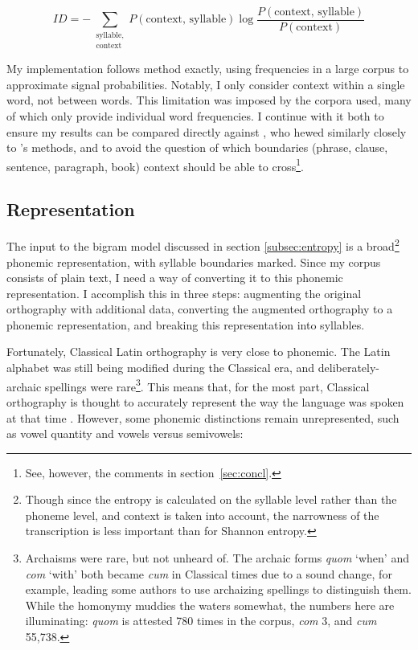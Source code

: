 \documentclass[12pt,twoside,leqno]{article} %
\begin{document}
\begin{equation}
\label{eq:id}
ID = - \sum_{\substack{\textrm{syllable},\\\textrm{context}}} P(\textrm{context, syllable}) \log \frac{P(\textrm{context, syllable})}{P(\textrm{context})}
\end{equation}

My implementation follows  method exactly, using frequencies in a large corpus to approximate signal probabilities. Notably, I only consider context within a single word, not between words. This limitation was imposed by the corpora \citeauthor{oh} used, many of which only provide individual word frequencies. I continue with it both to ensure my results can be compared directly against , who hewed similarly closely to \citeauthor{oh}'s methods, and to avoid the question of which boundaries (phrase, clause, sentence, paragraph, book) context should be able to cross\footnote{See, however, the comments in section~\ref{sec:concl}.}.

\subsection{Representation}
\label{subsec:repr}

The input to the bigram model discussed in section \ref{subsec:entropy} is a broad\footnote{Though since the entropy is calculated on the syllable level rather than the phoneme level, and context is taken into account, the narrowness of the transcription is less important than for Shannon entropy.} phonemic representation, with syllable boundaries marked. Since my corpus consists of plain text, I need a way of converting it to this phonemic representation. I accomplish this in three steps: augmenting the original orthography with additional data, converting the augmented orthography to a phonemic representation, and breaking this representation into syllables.

Fortunately, Classical Latin orthography is very close to phonemic. The Latin alphabet was still being modified during the Classical era, and deliberately-archaic spellings were rare\footnote{Archaisms were rare, but not unheard of. The archaic forms \emph{quom} `when' and \emph{com} `with' both became \emph{cum} in Classical times due to a sound change, for example, leading some authors to use archaizing spellings to distinguish them. While the homonymy muddies the waters somewhat, the numbers here are illuminating: \emph{quom} is attested 780 times in the corpus, \emph{com} 3, and \emph{cum} 55,738.}. This means that, for the most part, Classical orthography is thought to accurately represent the way the language was spoken at that time \citep[9]{allen}. However, some phonemic distinctions remain unrepresented, such as vowel quantity and vowels versus semivowels:
\end{document}
